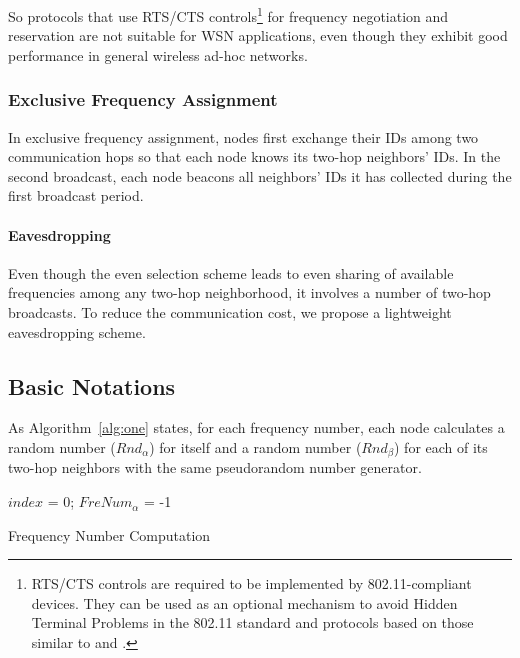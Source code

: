 So protocols \cite{Bahl-02, Culler-01,Zhou-06,Adya-01,
Tzamaloukas-01, Akyildiz-01} that use RTS/CTS
controls\footnote{RTS/CTS controls are required to be implemented by
802.11-compliant devices. They can be used as an optional mechanism
to avoid Hidden Terminal Problems in the 802.11 standard and
protocols based on those similar to \cite{Akyildiz-01} and
\cite{Adya-01}.} for frequency negotiation and reservation are not
suitable for WSN applications, even though they exhibit good
performance in general wireless ad-hoc
networks.

\subsubsection{Exclusive Frequency Assignment}


In exclusive frequency assignment, nodes first exchange their IDs
among two communication hops so that each node knows its two-hop
neighbors' IDs. In the second broadcast, each node beacons all
neighbors' IDs it has collected during the first broadcast period.

\paragraph{Eavesdropping}

Even though the even selection scheme leads to even sharing of
available frequencies among any two-hop neighborhood, it involves a
number of two-hop broadcasts. To reduce the communication cost, we
propose a lightweight eavesdropping scheme.

\subsection{Basic Notations}

As Algorithm~\ref{alg:one} states, for each frequency
number, each node calculates a random number (${\textit{Rnd}}_{\alpha}$) for
itself and a random number (${\textit{Rnd}}_{\beta}$) for each of its two-hop
neighbors with the same pseudorandom number generator.

\begin{algorithm}[t]
\SetAlgoNoLine
{}
$index$ = 0; $FreNum_{\alpha}$ = -1\;
\caption{Frequency Number Computation}
\label{alg:one}
\end{algorithm}


